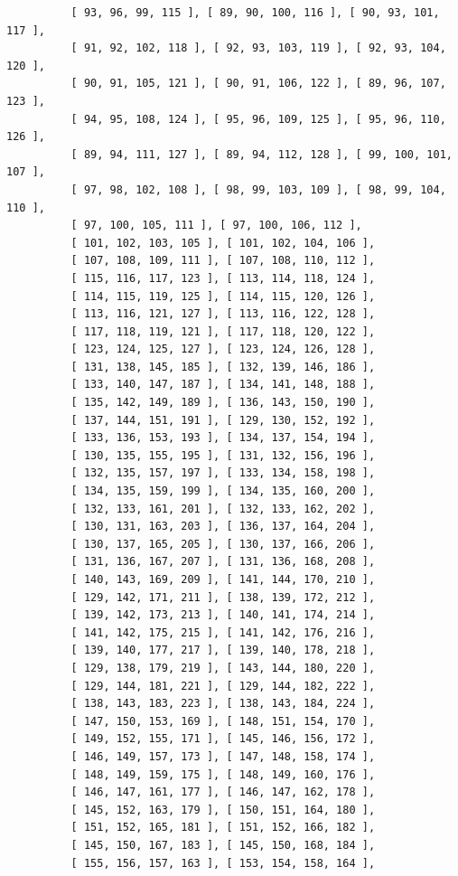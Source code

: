 \documentclass{article}
\begin{document}
\begin{verbatim}
          [ 93, 96, 99, 115 ], [ 89, 90, 100, 116 ], [ 90, 93, 101, 117 ], 
          [ 91, 92, 102, 118 ], [ 92, 93, 103, 119 ], [ 92, 93, 104, 120 ], 
          [ 90, 91, 105, 121 ], [ 90, 91, 106, 122 ], [ 89, 96, 107, 123 ], 
          [ 94, 95, 108, 124 ], [ 95, 96, 109, 125 ], [ 95, 96, 110, 126 ], 
          [ 89, 94, 111, 127 ], [ 89, 94, 112, 128 ], [ 99, 100, 101, 107 ],
          [ 97, 98, 102, 108 ], [ 98, 99, 103, 109 ], [ 98, 99, 104, 110 ], 
          [ 97, 100, 105, 111 ], [ 97, 100, 106, 112 ], 
          [ 101, 102, 103, 105 ], [ 101, 102, 104, 106 ], 
          [ 107, 108, 109, 111 ], [ 107, 108, 110, 112 ], 
          [ 115, 116, 117, 123 ], [ 113, 114, 118, 124 ], 
          [ 114, 115, 119, 125 ], [ 114, 115, 120, 126 ], 
          [ 113, 116, 121, 127 ], [ 113, 116, 122, 128 ], 
          [ 117, 118, 119, 121 ], [ 117, 118, 120, 122 ], 
          [ 123, 124, 125, 127 ], [ 123, 124, 126, 128 ], 
          [ 131, 138, 145, 185 ], [ 132, 139, 146, 186 ], 
          [ 133, 140, 147, 187 ], [ 134, 141, 148, 188 ], 
          [ 135, 142, 149, 189 ], [ 136, 143, 150, 190 ], 
          [ 137, 144, 151, 191 ], [ 129, 130, 152, 192 ], 
          [ 133, 136, 153, 193 ], [ 134, 137, 154, 194 ], 
          [ 130, 135, 155, 195 ], [ 131, 132, 156, 196 ], 
          [ 132, 135, 157, 197 ], [ 133, 134, 158, 198 ], 
          [ 134, 135, 159, 199 ], [ 134, 135, 160, 200 ], 
          [ 132, 133, 161, 201 ], [ 132, 133, 162, 202 ], 
          [ 130, 131, 163, 203 ], [ 136, 137, 164, 204 ], 
          [ 130, 137, 165, 205 ], [ 130, 137, 166, 206 ], 
          [ 131, 136, 167, 207 ], [ 131, 136, 168, 208 ], 
          [ 140, 143, 169, 209 ], [ 141, 144, 170, 210 ], 
          [ 129, 142, 171, 211 ], [ 138, 139, 172, 212 ], 
          [ 139, 142, 173, 213 ], [ 140, 141, 174, 214 ], 
          [ 141, 142, 175, 215 ], [ 141, 142, 176, 216 ], 
          [ 139, 140, 177, 217 ], [ 139, 140, 178, 218 ], 
          [ 129, 138, 179, 219 ], [ 143, 144, 180, 220 ], 
          [ 129, 144, 181, 221 ], [ 129, 144, 182, 222 ], 
          [ 138, 143, 183, 223 ], [ 138, 143, 184, 224 ], 
          [ 147, 150, 153, 169 ], [ 148, 151, 154, 170 ], 
          [ 149, 152, 155, 171 ], [ 145, 146, 156, 172 ], 
          [ 146, 149, 157, 173 ], [ 147, 148, 158, 174 ], 
          [ 148, 149, 159, 175 ], [ 148, 149, 160, 176 ], 
          [ 146, 147, 161, 177 ], [ 146, 147, 162, 178 ], 
          [ 145, 152, 163, 179 ], [ 150, 151, 164, 180 ], 
          [ 151, 152, 165, 181 ], [ 151, 152, 166, 182 ], 
          [ 145, 150, 167, 183 ], [ 145, 150, 168, 184 ], 
          [ 155, 156, 157, 163 ], [ 153, 154, 158, 164 ], 

\end{verbatim}
\end{document}
